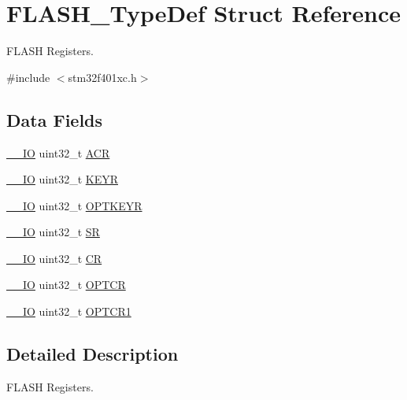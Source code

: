 \hypertarget{struct_f_l_a_s_h___type_def}{}\section{F\+L\+A\+S\+H\+\_\+\+Type\+Def Struct Reference}
\label{struct_f_l_a_s_h___type_def}


F\+L\+A\+SH Registers.  




{\ttfamily \#include $<$stm32f401xc.\+h$>$}

\subsection*{Data Fields}
\begin{DoxyCompactItemize}
\item 
\hyperlink{core__sc300_8h_aec43007d9998a0a0e01faede4133d6be}{\+\_\+\+\_\+\+IO} uint32\+\_\+t \hyperlink{struct_f_l_a_s_h___type_def_a9cb55206b29a8c16354747c556ab8bea}{A\+CR}
\item 
\hyperlink{core__sc300_8h_aec43007d9998a0a0e01faede4133d6be}{\+\_\+\+\_\+\+IO} uint32\+\_\+t \hyperlink{struct_f_l_a_s_h___type_def_a84c491be6c66b1d5b6a2efd0740b3d0c}{K\+E\+YR}
\item 
\hyperlink{core__sc300_8h_aec43007d9998a0a0e01faede4133d6be}{\+\_\+\+\_\+\+IO} uint32\+\_\+t \hyperlink{struct_f_l_a_s_h___type_def_afc4900646681dfe1ca43133d376c4423}{O\+P\+T\+K\+E\+YR}
\item 
\hyperlink{core__sc300_8h_aec43007d9998a0a0e01faede4133d6be}{\+\_\+\+\_\+\+IO} uint32\+\_\+t \hyperlink{struct_f_l_a_s_h___type_def_af6aca2bbd40c0fb6df7c3aebe224a360}{SR}
\item 
\hyperlink{core__sc300_8h_aec43007d9998a0a0e01faede4133d6be}{\+\_\+\+\_\+\+IO} uint32\+\_\+t \hyperlink{struct_f_l_a_s_h___type_def_ab40c89c59391aaa9d9a8ec011dd0907a}{CR}
\item 
\hyperlink{core__sc300_8h_aec43007d9998a0a0e01faede4133d6be}{\+\_\+\+\_\+\+IO} uint32\+\_\+t \hyperlink{struct_f_l_a_s_h___type_def_acfef9b6d7da4271943edc04d7dfdf595}{O\+P\+T\+CR}
\item 
\hyperlink{core__sc300_8h_aec43007d9998a0a0e01faede4133d6be}{\+\_\+\+\_\+\+IO} uint32\+\_\+t \hyperlink{struct_f_l_a_s_h___type_def_a1dddf235f246a1d4e7e5084cd51e2dd0}{O\+P\+T\+C\+R1}
\end{DoxyCompactItemize}


\subsection{Detailed Description}
F\+L\+A\+SH Registers. 

